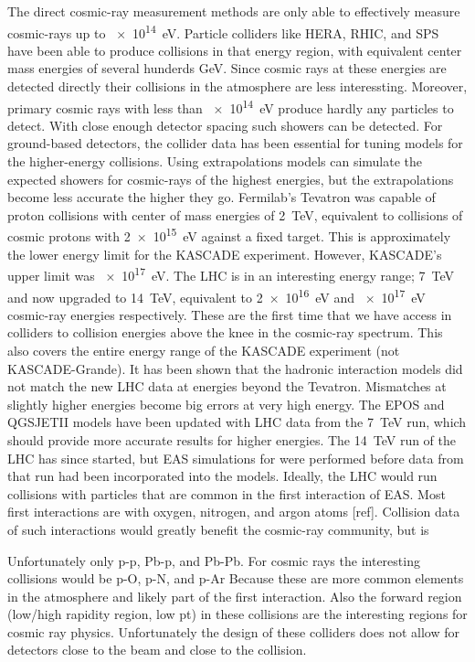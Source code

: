 The direct cosmic-ray measurement methods are only able to effectively measure cosmic-rays up to \SI{e14}{\eV}. Particle colliders like HERA, RHIC, and SPS have been able to produce collisions in that energy region, with equivalent center mass energies of several hunderds \si{\GeV}. Since cosmic rays at these energies are detected directly their collisions in the atmosphere are less interessting. Moreover, primary cosmic rays with less than \SI{e14}{\eV} produce hardly any particles to detect. With close enough detector spacing such showers can be detected. For ground-based detectors, the collider data has been essential for tuning models for the higher-energy collisions. Using extrapolations models can simulate the expected showers for cosmic-rays of the highest energies, but the extrapolations become less accurate the higher they go. Fermilab's Tevatron was capable of proton collisions with center of mass energies of \SI{2}{\TeV}, equivalent to collisions of cosmic protons with \SI{2e15}{\eV} against a fixed target. This is approximately the lower energy limit for the KASCADE experiment. However, KASCADE's upper limit was \SI{e17}{\eV}. The LHC is in an interesting energy range; \SI{7}{\TeV} and now upgraded to \SI{14}{\TeV}, equivalent to \SI{2e16}{\eV} and \SI{e17}{\eV} cosmic-ray energies respectively. These are the first time that we have access in colliders to collision energies above the knee in the cosmic-ray spectrum. This also covers the entire energy range of the KASCADE experiment (not KASCADE-Grande). It has been shown that the hadronic interaction models did not match the new LHC data at energies beyond the Tevatron. Mismatches at slightly higher energies become big errors at very high energy. The EPOS and QGSJETII models have been updated with LHC data from the \SI{7}{\TeV} run, which should provide more accurate results for higher energies. The \SI{14}{\TeV} run of the LHC has since started, but EAS simulations for \hisparc were performed before data from that run had been incorporated into the models. Ideally, the LHC would run collisions with particles that are common in the first interaction of EAS. Most first interactions are with oxygen, nitrogen, and argon atoms [ref]. Collision data of such interactions would greatly benefit the cosmic-ray community, but is 

Unfortunately only p-p, Pb-p, and Pb-Pb. For cosmic rays the interesting collisions would be p-O, p-N, and p-Ar Because these are more common elements in the atmosphere and likely part of the first interaction. Also the forward region (low/high rapidity region, low pt) in these collisions are the interesting regions for cosmic ray physics. Unfortunately the design of these colliders does not allow for detectors close to the beam and close to the collision.


